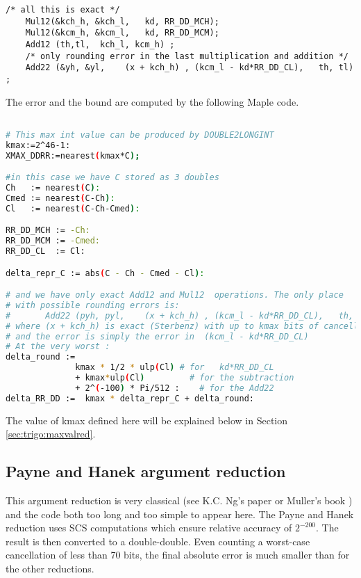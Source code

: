 \begin{lstlisting}[caption={Cody and Waite argument reduction in
    double-double},firstnumber=20]
    /* all this is exact */
    Mul12(&kch_h, &kch_l,   kd, RR_DD_MCH);
    Mul12(&kcm_h, &kcm_l,   kd, RR_DD_MCM);
    Add12 (th,tl,  kch_l, kcm_h) ;
    /* only rounding error in the last multiplication and addition */ 
    Add22 (&yh, &yl,    (x + kch_h) , (kcm_l - kd*RR_DD_CL),   th, tl) ;
\end{lstlisting}


The error and the bound are computed by the following Maple code.

\begin{lstlisting}[caption={Maple script for computing constants for Cody and Waite
    double-double\label{trigo:lst:cwddrmaple}},
  language={sh}, numbers=none]% of course it's maple
%Skip a line here, I don't know why, otherwise latex eats the first line

# This max int value can be produced by DOUBLE2LONGINT
kmax:=2^46-1:
XMAX_DDRR:=nearest(kmax*C);

#in this case we have C stored as 3 doubles
Ch   := nearest(C):
Cmed := nearest(C-Ch):
Cl   := nearest(C-Ch-Cmed):

RR_DD_MCH := -Ch:
RR_DD_MCM := -Cmed:
RR_DD_CL  := Cl:

delta_repr_C := abs(C - Ch - Cmed - Cl):

# and we have only exact Add12 and Mul12  operations. The only place
# with possible rounding errors is:
#       Add22 (pyh, pyl,    (x + kch_h) , (kcm_l - kd*RR_DD_CL),   th, tl) ;
# where (x + kch_h) is exact (Sterbenz) with up to kmax bits of cancellation
# and the error is simply the error in  (kcm_l - kd*RR_DD_CL)
# At the very worst :
delta_round :=
              kmax * 1/2 * ulp(Cl) # for   kd*RR_DD_CL
              + kmax*ulp(Cl)         # for the subtraction
              + 2^(-100) * Pi/512 :    # for the Add22
delta_RR_DD :=  kmax * delta_repr_C + delta_round:
\end{lstlisting}

The value of kmax defined here will be explained below in Section
\ref{sec:trigo:maxvalred}.

\subsection{Payne and Hanek argument reduction }

This argument reduction is very classical (see K.C. Ng's
paper\cite{Ng1992} or Muller's book \cite{Muller97}) and the code both
too long and too simple to appear here. The Payne and Hanek reduction
uses SCS computations which ensure relative accuracy of $2^{-200}$.
The result is then converted to a double-double.  Even counting a
worst-case cancellation of less than 70 bits, the final absolute error
is much smaller than for the other reductions.

